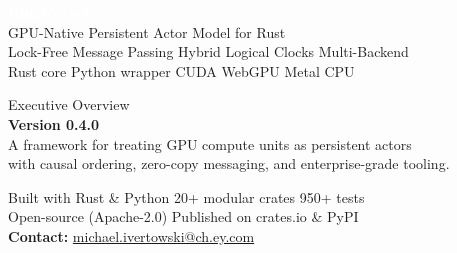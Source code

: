 \documentclass[11pt,a4paper]{article}
\begin{document}
\begin{titlepage}

\vspace*{1.5cm}
\begin{flushleft}
  {\fontsize{38}{44}\selectfont\bfseries\textcolor{white}{RingKernel}}\\[0.5em]
  {\fontsize{16}{20}\selectfont\textcolor{white!85}{GPU-Native Persistent Actor Model for Rust}}\\[0.3em]
  {\large\textcolor{white!65}{Lock-Free Message Passing \textbullet{} Hybrid Logical Clocks \textbullet{} Multi-Backend}}\\[0.3em]
  {\normalsize\textcolor{white!50}{Rust core \textbullet{} Python wrapper \textbullet{} CUDA \textbullet{} WebGPU \textbullet{} Metal \textbullet{} CPU}}
\end{flushleft}

\vspace{5.5cm}

\begin{flushleft}
  \textcolor{midgray}{\large Executive Overview}\\[0.8em]
  {\Large\textcolor{brand}{\textbf{Version 0.4.0}}}\\[1.5em]
  \textcolor{midgray}{%
    A framework for treating GPU compute units as persistent actors\\
    with causal ordering, zero-copy messaging, and enterprise-grade tooling.%
  }
\end{flushleft}

\vfill
\begin{flushleft}
  \textcolor{midgray}{\small
    Built with Rust \& Python \textbullet{} 20+ modular crates \textbullet{} 950+ tests\\[4pt]
    Open-source (Apache-2.0) \textbullet{} Published on crates.io \& PyPI\\[4pt]
    \textbf{Contact:} \href{mailto:michael.ivertowski@ch.ey.com}{michael.ivertowski@ch.ey.com}
  }
\end{flushleft}
\end{titlepage}
\end{document}

